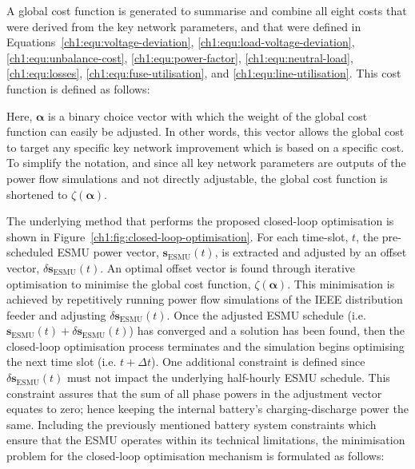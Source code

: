 A global cost function is generated to summarise and combine all eight costs that were derived from the key network parameters, and that were defined in Equations~\ref{ch1:equ:voltage-deviation}, \ref{ch1:equ:load-voltage-deviation}, \ref{ch1:equ:unbalance-cost}, \ref{ch1:equ:power-factor}, \ref{ch1:equ:neutral-load}, \ref{ch1:equ:losses}, \ref{ch1:equ:fuse-utilisation}, and \ref{ch1:equ:line-utilisation}.
This cost function is defined as follows:



Here, $\boldsymbol{\alpha}$ is a binary choice vector with which the weight of the global cost function can easily be adjusted.
In other words, this vector allows the global cost to target any specific key network improvement which is based on a specific cost.
To simplify the notation, and since all key network parameters are outputs of the power flow simulations and not directly adjustable, the global cost function is shortened to $\zeta(\boldsymbol{\alpha})$.




The underlying method that performs the proposed closed-loop optimisation is shown in Figure~\ref{ch1:fig:closed-loop-optimisation}.
For each time-slot, $t$, the pre-scheduled ESMU power vector, $\textbf{s}_\text{ESMU}(t)$, is extracted and adjusted by an offset vector, $\delta \textbf{s}_\text{ESMU}(t)$.
An optimal offset vector is found through iterative optimisation to minimise the global cost function, $\zeta(\boldsymbol{\alpha})$.
This minimisation is achieved by repetitively running power flow simulations of the IEEE distribution feeder and adjusting $\delta\textbf{s}_\text{ESMU}(t)$.
Once the adjusted ESMU schedule (i.e. $\textbf{s}_\text{ESMU}(t) + \delta \textbf{s}_\text{ESMU}(t)$) has converged and a solution has been found, then the closed-loop optimisation process terminates and the simulation begins optimising the next time slot (i.e. $t+\Delta t$).
One additional constraint is defined since $\delta \textbf{s}_\text{ESMU}(t)$ must not impact the underlying half-hourly ESMU schedule.
This constraint assures that the sum of all phase powers in the adjustment vector equates to zero; hence keeping the internal battery's charging-discharge power the same.
Including the previously mentioned battery system constraints which ensure that the ESMU operates within its technical limitations, the minimisation problem for the closed-loop optimisation mechanism is formulated as follows:


